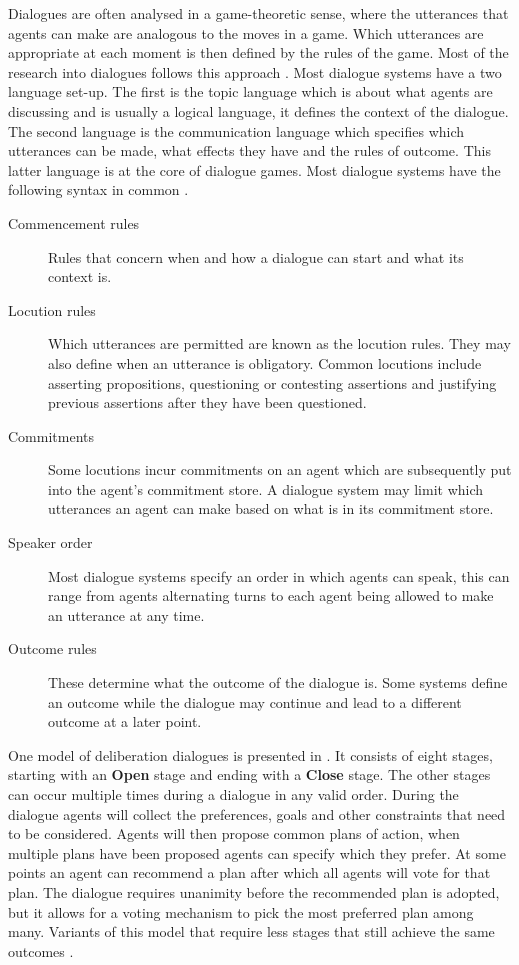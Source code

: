\documentclass[a4paper]{article}
\begin{document}
Dialogues are often analysed in a game-theoretic sense, where the utterances
that agents can make are analogous to the moves in a game. Which utterances are
appropriate at each moment is then defined by the rules of the game. Most of
the research into dialogues follows this approach
\cite{prakken2006,prakken2009}. Most dialogue systems have a two language
set-up. The first is the topic language which is about what agents are
discussing and is usually a logical language, it defines the context of the
dialogue. The second language is the communication language which specifies
which utterances can be made, what effects they have and the rules of outcome.
This latter language is at the core of dialogue games. Most dialogue systems
have the following syntax in common \cite{prakken2006,prakken2009,mcburney2009}.
\begin{description}
	\item[Commencement rules] Rules that concern when and how a dialogue can
	start and what its context is.
	\item[Locution rules] Which utterances are permitted are known as the
	locution rules. They may also define when an utterance is obligatory.
	Common locutions include asserting propositions, questioning or contesting
	assertions and justifying previous assertions after they have been
	questioned.
	\item[Commitments] Some locutions incur commitments on an agent which are
	subsequently put into the agent's commitment store. A dialogue system may
	limit which utterances an agent can make based on what is in its commitment
	store.
	\item[Speaker order] Most dialogue systems specify an order in which agents
	can speak, this can range from agents alternating turns to each agent being
	allowed to make an utterance at any time.
	\item[Outcome rules] These determine what the outcome of the dialogue is.
	Some systems define an outcome while the dialogue may continue and lead to
	a different outcome at a later point.
\end{description}

One model of deliberation dialogues is presented in \cite{mcburney2007}. It
consists of eight stages, starting with an \textbf{Open} stage and ending with
a \textbf{Close} stage. The other stages can occur multiple times during a
dialogue in any valid order. During the dialogue agents will collect the
preferences, goals and other constraints that need to be considered. Agents
will then propose common plans of action, when multiple plans have been
proposed agents can specify which they prefer. At some points an agent can
recommend a plan after which all agents will vote for that plan. The dialogue
requires unanimity before the recommended plan is adopted, but it allows for a
voting mechanism to pick the most preferred plan among many. Variants of this
model that require less stages that still achieve the same outcomes
\cite{dunin-keplicz2011}.
\end{document}
